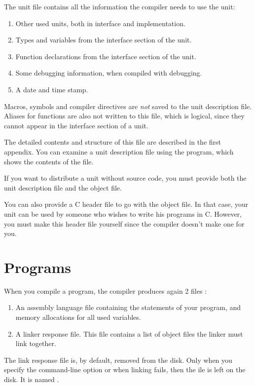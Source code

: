 \documentclass{report}
\begin{document}
The unit file contains all the information the compiler needs to use the
unit:
\begin{enumerate}
\item Other used units, both in interface and implementation.
\item Types and variables from the interface section of the unit.
\item Function declarations from the interface section of the unit.
\item Some debugging information, when compiled with debugging.
\item A date and time stamp.
\end{enumerate}
Macros, symbols and compiler directives are {\em not} saved to the unit
description file. Aliases for functions are also not written to this file,
which is logical, since they cannot appear in the interface section of a
unit.

The detailed contents and structure of this file are described in the first
appendix. You can examine a unit description file using the 
program, which shows the contents of the file.

If you want to distribute a unit without source code, you must provide both
the unit description file and the object file.

You can also provide a C header file to go with the object file. In that
case, your unit can be used by someone who wishes to write his programs in
C. However, you must make this header file yourself since the \fpc compiler
doesn't make one for you.

\section{Programs}
\label{se:Programs}

When you compile a program, the compiler produces again 2 files :
\begin{enumerate}
\item An assembly language file containing the statements of your program,
and memory allocations for all used variables.
\item A linker response file. This file contains a list of object files the
linker must link together.
\end{enumerate}
The link response file is, by default, removed from the disk. Only when you
specify the  command-line option or when linking fails, then the ile
is left on the disk. It is named .
\end{document}
